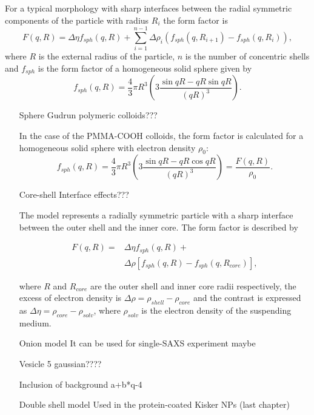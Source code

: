 For a typical morphology with sharp interfaces between the radial symmetric components of the particle with radius \(R_i\) the form factor is
\begin{equation}
\label{eq:multicore-shell}
F\left(q,R \right)= \Delta \eta f_{sph}(q,R)+\sum_{i=1}^{n-1} \Delta\rho_i \left( f_{sph}(q,R_{i+1})-f_{sph}(q,R_{i}) \right) ,
\end{equation}
where \(R\) is the external radius of the particle, \( n \) is the number of concentric shells and \(f_{sph}\) is the form factor of a homogeneous solid sphere given by
\begin{equation}
f_{sph}(q,R)=\frac{4}{3} \pi R^3  \left( 3\frac{\sin{qR}-qR\sin{qR}}{(qR)^3}\right).
\label{eq:ff_sph}
\end{equation}
\begin{itemize}
	\item [Sphere] Gudrun polymeric colloids???
	
	In the case of the PMMA-COOH colloids, the form factor is calculated for a homogeneous solid sphere with electron density $\rho_0$:
\begin{equation}
f_{sph}(q,R)=\frac{4}{3} \pi R^3  \left( 3\frac{\sin{qR}-qR\cos{qR}}{(qR)^3}\right)=\frac{F(q,R)}{\rho_0}.
\label{eq:ff_sph}
\end{equation}
	\item [Core-shell] Interface effects???
	
	The model represents a radially symmetric particle with a sharp interface between the outer shell and the inner core. The form factor is described by

\begin{equation}
	\begin{split}
	F(q,R)= & \Delta\eta f_{sph}(q,R)+ \\
	& \Delta\rho\left[ f_{sph}(q,R)-f_{sph}(q,R_{core}) \right] ,
	\end{split}
\label{eq:ff_cs}
\end{equation}

where \(R \) and \(R_{core} \)  are the outer shell and inner core radii respectively, the excess of electron density is \(\Delta\rho=\rho_{shell}-\rho_{core}\) and the contrast is expressed as \(\Delta\eta=\rho_{core}-\rho_{solv}\), where $\rho_{solv}$ is the electron density of the suspending medium.

	\item [Onion model] It can be used for single-SAXS experiment maybe
	\item [Vesicle] 5 gaussian????
	\item [Inclusion of background] a+b*q-4
	\item [Double shell model] Used in the protein-coated Kisker NPs (last chapter)
\end{itemize}

